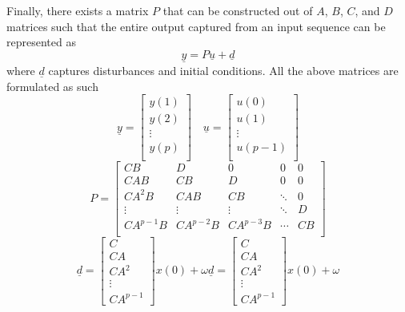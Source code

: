 Finally, there exists a matrix $P$ that can be constructed out of $A$, $B$, $C$, and $D$ matrices such that the entire output captured from an input sequence can be represented as 
\begin{equation}
    \underline{y}=P\underline{u}+\underline{d}
    \label{eq:y_Pu_d}
\end{equation}
where $\underline{d}$ captures disturbances and initial conditions. All the above matrices are formulated as such
\begin{equation}
    \underline{y}=\left[\begin{matrix}y\left(1\right)\\y\left(2\right)\\\vdots\\y\left(p\right)\\\end{matrix}\right]
    \quad
    \underline{u}=\left[\begin{matrix}u\left(0\right)\\u\left(1\right)\\\vdots\\u\left(p-1\right)\\\end{matrix}\right]
    \label{eq:y_u_stacks}
\end{equation}
\begin{equation}
    P=\left[\begin{matrix}CB&D&0&0&0\\CAB&CB&D&0&0\\CA^2B&CAB&CB&\ddots&0\\\vdots&\vdots&\vdots&\ddots&D\\CA^{p-1}B&CA^{p-2}B&CA^{p-3}B&\cdots&CB\\\end{matrix}\right]
    \label{ILC_P}
\end{equation}
\begin{equation}
    \underline{d} = 
    \begin{bmatrix}
        C \\ CA \\ CA^2 \\ \vdots \\ CA^{p-1}
    \end{bmatrix}
    x(0) + \omega\underline{d} = 
    \begin{bmatrix}
        C \\ CA \\ CA^2 \\ \vdots \\ CA^{p-1}
    \end{bmatrix}
    x(0) + \omega
\end{equation}

